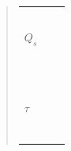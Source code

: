 \begin{quote}
\begin{table}[h]
\begin{addmargin}[-1cm]{3cm}
\begin{tabular}{|p{3cm}|p{3cm}|p{10.2cm}|}
                                 &           &                  \\
                                 &           &                  \\ 
                                 &           &                  \\
                                 &           &                  \\ 
                                 &           &                  \\
         \hline
         $Q_{s}$                 &           &\\
                                 &           &                  \\ 
                                 &           &                  \\
                                 &           &                  \\ 
                                 &           &                  \\
                                 &           &                  \\ 
                                 &           &                  \\
                                 &           &                  \\ 
                                 &           &                  \\
                                 &           &                  \\ 
                                 &           &                  \\
                                 &           &                  \\ 
                                 &           &                  \\
         \hline
         $\tau$                  &           &\\
                                 &           &                  \\ 
                                 &           &                  \\
                                 &           &                  \\ 
                                 &           &                  \\
                                 &           &                  \\ 
                                 &           &                  \\

\end{tabular}
\end{addmargin}
\end{table}
\end{quote}
